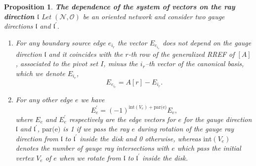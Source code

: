 \documentclass[11pt]{amsart}
\theoremstyle{plain}
\numberwithin{equation}{section}
\newtheorem{proposition}[theorem]{Proposition}
\begin{document}
\begin{proposition}\label{prop:rays}\textbf{The dependence of the system of vectors on the ray direction $\mathfrak l$}
Let $({\mathcal N},\mathcal O)$ be an oriented network and consider two gauge directions $\mathfrak l$ and 
$\mathfrak{l}^{\prime}$.
\begin{enumerate}
\item For any boundary source edge $e_{i_r}$ the vector $E_{e_{i_r}}$ does not depend on the gauge direction $\mathfrak l$ 
and it coincides with the $r$-th row of the generalized RREF of $[A]$, associated to the pivot set $I$,  minus  the $i_r$--th vector of the canonical basis, which we denote $E_{i_r}$,
\begin{equation}
\label{eq:Ei}
E_{e_{i_r}} = A[r] -E_{i_r}.
\end{equation}
\item For any other edge $e$ we have
\begin{equation}\label{eq:vector_ray}
E^{\prime}_e = (-1)^{\mbox{int}(V_e)+\mbox{par(e)}} E_e,
\end{equation} 
where $E_e$ and  $E^{\prime}_e$ respectively are 
the edge vectors for $e$ for the gauge direction ${\mathfrak l}$ and ${\mathfrak l}^{\prime}$, $\mbox{par(e)}$ is 1 if 
we pass the ray $e$ during rotation of the gauge ray direction from ${\mathfrak l}$ to ${\mathfrak l}^{\prime}$ inside the disk and 0 otherwise,
whereas $\mbox{int}(V_e)$ denotes the number of gauge ray intersections with $e$ which pass the initial vertex $V_e$ of $e$ when we rotate from ${\mathfrak l}$ to ${\mathfrak l}^{\prime}$ inside the disk.
\end{enumerate}
\end{proposition}
\end{document}
